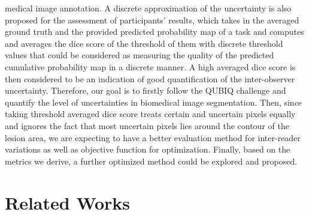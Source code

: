 \documentclass[12pt]{extarticle}
\begin{document}
medical image annotation. A discrete approximation of the uncertainty is also
proposed for the assessment of participants' results, which
takes in the averaged ground truth and the provided predicted probability map of a task
and computes and averages the dice score of the threshold of them with
discrete threshold values\cite{qubiq} that could be considered as 
measuring the quality of the predicted cumulative probability map in a discrete manner. 
A high averaged dice score is then considered to be an indication of 
good quantification of the inter-observer uncertainty.
Therefore, our goal is to firstly follow the QUBIQ challenge and quantify the level of 
uncertainties in biomedical image segmentation. 
Then, since taking threshold averaged dice score treats certain and uncertain pixels equally 
and ignores the fact that most uncertain pixels lies around 
the contour of the lesion area, we are expecting to have a
better evaluation method for inter-reader variations as well as objective function for 
optimization. Finally, based on the metrics we derive, a further
optimized method could be explored and proposed.
\section{Related Works}
\end{document}
